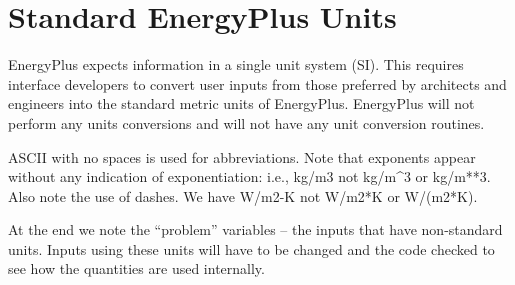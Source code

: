 \section{Standard EnergyPlus Units}\label{standard-energyplus-units}

EnergyPlus expects information in a single unit system (SI). This requires interface developers to convert user inputs from those preferred by architects and engineers into the standard metric units of EnergyPlus. EnergyPlus will not perform any units conversions and will not have any unit conversion routines.

ASCII with no spaces is used for abbreviations. Note that exponents appear without any indication of exponentiation: i.e., kg/m3 not kg/m\^{}3 or kg/m**3. Also note the use of dashes. We have W/m2-K not W/m2*K or W/(m2*K).

At the end we note the ``problem'' variables -- the inputs that have non-standard units. Inputs using these units will have to be changed and the code checked to see how the quantities are used internally.

